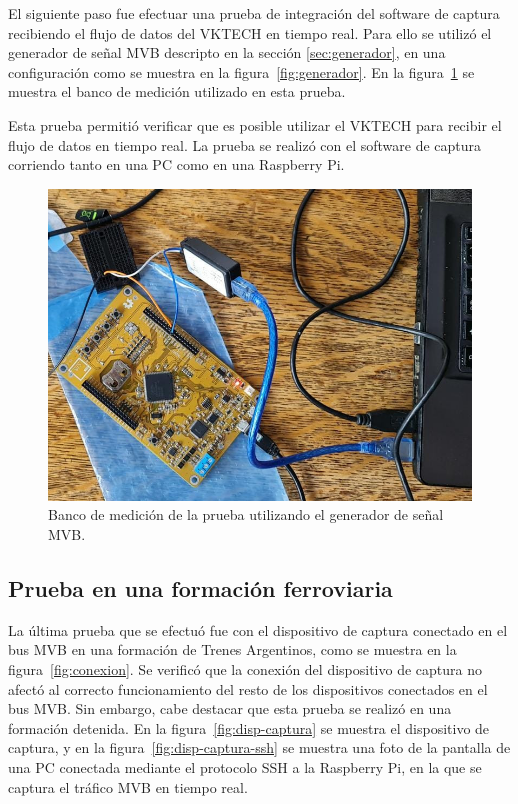 
El siguiente paso fue efectuar una prueba de integración del software de captura recibiendo el flujo de datos del VKTECH en tiempo real.
Para ello se utilizó el generador de señal MVB descripto en la sección \ref{sec:generador}, en una configuración como se muestra en la figura~\ref{fig:generador}.
En la figura~\ref{fig:educiaa+vktech} se muestra el banco de medición utilizado en esta prueba.

Esta prueba permitió verificar que es posible utilizar el VKTECH para recibir el flujo de datos en tiempo real.
La prueba se realizó con el software de captura corriendo tanto en una PC como en una Raspberry Pi.

\begin{figure}[htbp]
	\centering
	\includegraphics[width=\textwidth]{./Figures/educiaa+vktech.jpg}
	\caption{Banco de medición de la prueba utilizando el generador de señal MVB.}
    \label{fig:educiaa+vktech}
\end{figure}


\subsection{Prueba en una formación ferroviaria}



La última prueba que se efectuó fue con el dispositivo de captura conectado en el bus MVB en una formación de Trenes Argentinos, como se muestra en la figura~\ref{fig:conexion}.
Se verificó que la conexión del dispositivo de captura no afectó al correcto funcionamiento del resto de los dispositivos conectados en el bus MVB. Sin embargo, cabe destacar que esta prueba se realizó en una formación detenida.
En la figura~\ref{fig:disp-captura} se muestra el dispositivo de captura, y en la figura~\ref{fig:disp-captura-ssh} se muestra una foto de la pantalla de una PC conectada mediante el protocolo SSH a la Raspberry Pi, en la que se captura el tráfico MVB en tiempo real.

